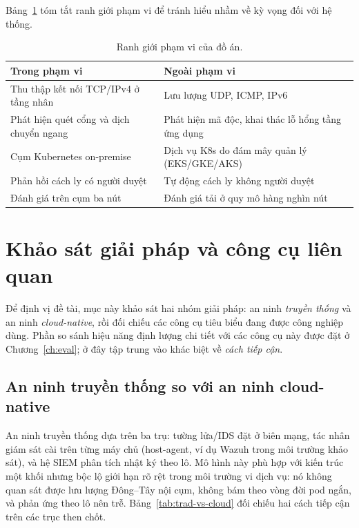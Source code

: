Bảng~\ref{tab:scope} tóm tắt ranh giới phạm vi để tránh hiểu nhầm về kỳ vọng đối với hệ
thống.

\begin{table}[H]
  \centering
  \caption{Ranh giới phạm vi của đồ án.}
  \label{tab:scope}
  \small
  \begin{tabularx}{\linewidth}{@{}X X@{}}
    \toprule
    \textbf{Trong phạm vi} & \textbf{Ngoài phạm vi} \\
    \midrule
    Thu thập kết nối TCP/IPv4 ở tầng nhân & Lưu lượng UDP, ICMP, IPv6 \\
    Phát hiện quét cổng và dịch chuyển ngang & Phát hiện mã độc, khai thác lỗ hổng tầng ứng dụng \\
    Cụm Kubernetes on-premise & Dịch vụ K8s do đám mây quản lý (EKS/GKE/AKS) \\
    Phản hồi cách ly có người duyệt & Tự động cách ly không người duyệt \\
    Đánh giá trên cụm ba nút & Đánh giá tải ở quy mô hàng nghìn nút \\
    \bottomrule
  \end{tabularx}
\end{table}

\section{Khảo sát giải pháp và công cụ liên quan}
\label{sec:related-work}

Để định vị đề tài, mục này khảo sát hai nhóm giải pháp: an ninh \emph{truyền thống} và an
ninh \emph{cloud-native}, rồi đối chiếu các công cụ tiêu biểu đang được công nghiệp dùng.
Phần so sánh hiệu năng định lượng chi tiết với các công cụ này được đặt ở
Chương~\ref{ch:eval}; ở đây tập trung vào khác biệt về \emph{cách tiếp cận}.

\subsection{An ninh truyền thống so với an ninh cloud-native}

An ninh truyền thống dựa trên ba trụ: tường lửa/IDS đặt ở biên mạng, tác nhân giám sát
cài trên từng máy chủ (host-agent, ví dụ Wazuh trong môi trường khảo sát), và hệ SIEM
phân tích nhật ký theo lô. Mô hình này phù hợp với kiến trúc một khối nhưng bộc lộ giới
hạn rõ rệt trong môi trường vi dịch vụ: nó không quan sát được lưu lượng Đông--Tây nội cụm,
không bám theo vòng đời pod ngắn, và phản ứng theo lô nên trễ. Bảng~\ref{tab:trad-vs-cloud}
đối chiếu hai cách tiếp cận trên các trục then chốt.

